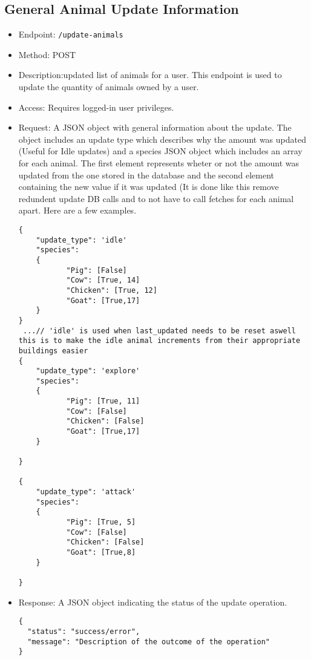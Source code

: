\documentclass[12pt]{article}
\begin{document}
\subsection{General Animal Update Information}
\begin{itemize}
    \item Endpoint: \texttt{/update-animals}
    \item Method: POST
    \item Description:updated list of animals for a user. This endpoint is used to update the quantity of animals owned by a user.
    \item Access: Requires logged-in user privileges.
    \item Request: A JSON object with general information about the update.
    The object includes an update type which describes why the amount was updated (Useful for Idle updates) and a species JSON object which includes an array for each animal. The first element represents wheter or not the amount was updated from the one stored in the database and the second element containing the new value if it was updated (It is done like this remove redundent update DB calls and to not have to call fetches for each animal apart. Here are a few examples.
    \begin{verbatim}
{
    "update_type": 'idle'
    "species":
    {
	       "Pig": [False]
	       "Cow": [True, 14]
	       "Chicken": [True, 12]
	       "Goat": [True,17]
    }
}
 ...// 'idle' is used when last_updated needs to be reset aswell this is to make the idle animal increments from their appropriate buildings easier
{
    "update_type": 'explore'
    "species":
    {
	       "Pig": [True, 11]
	       "Cow": [False]
	       "Chicken": [False]
	       "Goat": [True,17]
    }

}

{
    "update_type": 'attack'
    "species":
    {
	       "Pig": [True, 5]
	       "Cow": [False]
	       "Chicken": [False]
	       "Goat": [True,8]
    }

}
    \end{verbatim}
    \item Response: A JSON object indicating the status of the update operation.
    \begin{verbatim}
{
  "status": "success/error",
  "message": "Description of the outcome of the operation"
}
    \end{verbatim}
\end{itemize}
\end{document}
